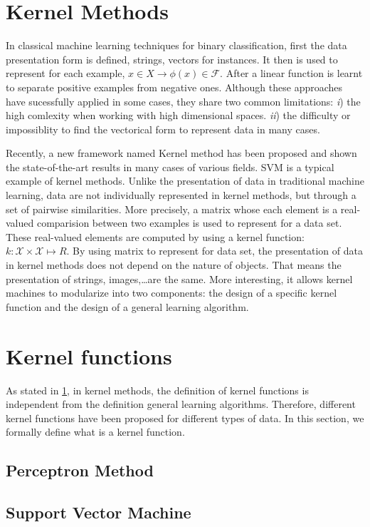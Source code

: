 \section{Kernel Methods}
\label{kernel-methods}
In classical machine learning techniques for binary classification, first the data presentation form is defined, strings, vectors for instances. It then is used to represent for each example, $x \in X \longrightarrow \phi(x) \in \mathcal{F}$. After a linear function is learnt to separate positive examples from negative ones. Although these approaches have sucessfully applied in some cases, they share two common limitations: \textit{i}) the high comlexity when working with high dimensional spaces. \textit{ii}) the difficulty or impossiblity to find the vectorical form to represent data in many cases.

Recently, a new framework named Kernel method has been proposed and shown the state-of-the-art results in many cases of various fields. SVM \cite{cortes1995support} is a typical example of kernel methods. Unlike the presentation of data in traditional machine learning, data are not individually represented in kernel methods, but through a set of pairwise similarities. More precisely, a matrix whose each element is a real-valued comparision between two examples is used to represent for a data set. These real-valued elements are computed by using a kernel function: $k: \mathcal{X} \times \mathcal{X} \longmapsto R$. By using matrix to represent for data set, the presentation of data in kernel methods does not depend on the nature of objects. That means the presentation of strings, images,\ldots are the same. More interesting, it allows kernel machines to modularize into two components: the design of a specific kernel function and the design of a general learning algorithm.
\section{Kernel functions}
As stated in \ref{kernel-methods}, in kernel methods, the definition of kernel functions is independent from the definition general learning algorithms. Therefore, different kernel functions have been proposed for different types of data. In this section, we formally define what is a kernel function.
\subsection{Perceptron Method}
\subsection{Support Vector Machine}
